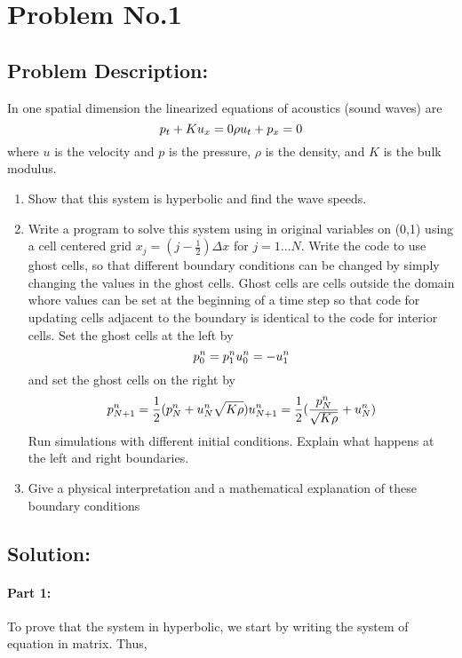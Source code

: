 \section{Problem No.1} \label{sec:prob2}
\subsection{Problem Description:} 
In one spatial dimension the linearized equations of acoustics (sound waves) are
$$
p_{t} + Ku_{x}=0\\
\rho u_{t}+p_{x}=0
$$
where $u$ is the velocity and $p$ is the pressure, $\rho$ is the density, and $K$ is the bulk modulus.
\begin{enumerate}
\item Show that this system is hyperbolic and find the wave speeds.
\item Write a program to solve this system using \protect{\lw} in original variables on (0,1) using a cell centered grid $x_{j}=(j-\frac{1}{2})\Delta x$ for $j=1...N.$ Write the code to use ghost cells, so that different boundary conditions can be changed by simply changing the values in the ghost cells. Ghost cells are cells outside the domain whore values can be set at the beginning of a time step so that code for updating cells adjacent to the boundary is identical to the code for interior cells.
Set the ghost cells at the left by 
$$
p_{0}^{n}=p_{1}^{n}\\
u_{0}^{n}=-u_{1}^{n}
$$
and set the ghost cells on the right by
$$
p_{N+1}^{n} = \frac{1}{2}(p_{N}^{n}+u_{N}^{n}\sqrt{K\rho})\\
u_{N+1}^{n} = \frac{1}{2}(\frac{p_{N}^{n}}{\sqrt{K\rho}} + u_{N}^{n})
$$
Run simulations with different initial conditions. Explain what happens at the left and right boundaries. 
\item Give a physical interpretation and a mathematical explanation of these boundary conditions

\end{enumerate}




\subsection{Solution:} 
\paragraph{Part 1:} To prove that the system in hyperbolic, we start by writing the system of equation in matrix. Thus,

